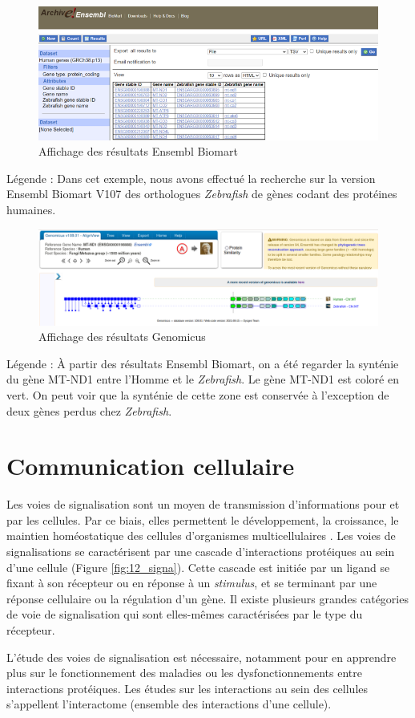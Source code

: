 \begin{figure}[H]
    \centering
    \includegraphics[width=1\textwidth]{figures/corps/figure10.png}
    \caption{Affichage des résultats Ensembl Biomart}
    \label{fig:10_biomart}
\end{figure}
Légende : Dans cet exemple, nous avons effectué la recherche sur la version Ensembl Biomart V107 des orthologues \textit{Zebrafish} de gènes codant des protéines humaines.  \\
\begin{figure}[H]
    \centering
    \includegraphics[width=1\textwidth]{figures/corps/figure11.png}
    \caption{Affichage des résultats Genomicus}
    \label{fig:11_genomicus}
\end{figure}
Légende : À partir des résultats Ensembl Biomart, on a été regarder la synténie du gène MT-ND1 entre l’Homme et le \textit{Zebrafish}. Le gène MT-ND1 est coloré en vert. On peut voir que la synténie de cette zone est conservée à l’exception de deux gènes perdus chez \textit{Zebrafish}.

\newpage
\section{Communication cellulaire} \label{commcel}
\par Les voies de signalisation sont un moyen de transmission d’informations pour et par les cellules. Par ce biais, elles permettent le développement, la croissance, le maintien homéostatique des cellules d’organismes multicellulaires \parencite{combarnous_communications_2013}. Les voies de signalisations se caractérisent par une cascade d’interactions protéiques au sein d’une cellule (Figure \ref{fig:12_signa}). Cette cascade est initiée par un ligand se fixant à son récepteur ou en réponse à un \textit{stimulus}, et se terminant par une réponse cellulaire ou la régulation d’un gène. Il existe plusieurs grandes catégories de voie de signalisation qui sont elles-mêmes caractérisées par le type du récepteur. 
\par L’étude des voies de signalisation est nécessaire, notamment pour en apprendre plus sur le fonctionnement des maladies ou les dysfonctionnements entre interactions protéiques. Les études sur les interactions au sein des cellules s’appellent l’interactome (ensemble des interactions d’une cellule). 

